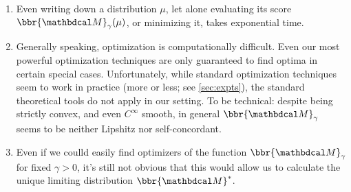 \documentclass[twoside]{article}
\begin{document}
\begin{enumerate}[nosep, label=\textbf{D\arabic*.}]
    \item Even writing down a distribution $\mu$, let alone evaluating its score $\bbr{\dg M}_\gamma (\mu)$, or minimizing it, takes exponential time.
    
    \item Generally speaking, optimization is computationally difficult.
      Even our most powerful optimization techniques are only
      guaranteed to
      find optima in certain special cases. 
    Unfortunately, while standard optimization techniques seem to work in practice
%
      (more or less; see \cref{sec:expts}), the standard theoretical
      tools do not apply in our setting.
        To be technical: despite being strictly convex,
        and even $C^\infty$ smooth, 
        in general $\bbr{\dg M}_\gamma$ seems to be neither Lipshitz nor self-concordant.
    \item Even if we coulld easily find optimizers of the function $\bbr{\dg M}_\gamma$ for fixed $\gamma > 0$, it's still not obvious that this would allow us to calculate the unique limiting distribution $\bbr{\dg M}^*$.
\end{enumerate}
\end{document}
